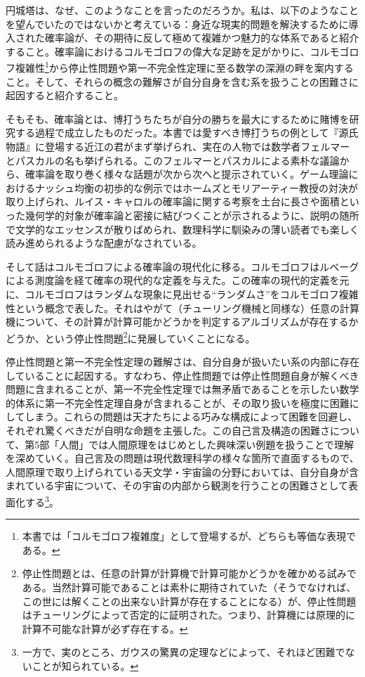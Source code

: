 \documentclass[10pt, a5paper, twoside]{jsarticle}
\theoremstyle{definition}
\begin{document}
		円城塔は、なぜ、このようなことを言ったのだろうか。私は、以下のようなことを望んでいたのではないかと考えている：身近な現実的問題を解決するために導入された確率論が、その期待に反して極めて複雑かつ魅力的な体系であると紹介すること。確率論におけるコルモゴロフの偉大な足跡を足がかりに、コルモゴロフ複雑性\footnote{本書では「コルモゴロフ複雑度」として登場するが、どちらも等価な表現である。}から停止性問題や第一不完全性定理に至る数学の深淵の畔を案内すること。そして、それらの概念の難解さが自分自身を含む系を扱うことの困難さに起因すると紹介すること。

		そもそも、確率論とは、博打うちたちが自分の勝ちを最大にするために賭博を研究する過程で成立したものだった。本書では愛すべき博打うちの例として『源氏物語』に登場する近江の君がまず挙げられ、実在の人物では数学者フェルマーとパスカルの名も挙げられる。このフェルマーとパスカルによる素朴な議論から、確率論を取り巻く様々な話題が次から次へと提示されていく。ゲーム理論におけるナッシュ均衡の初歩的な例示ではホームズとモリアーティー教授の対決が取り上げられ、ルイス・キャロルの確率論に関する考察を土台に長さや面積といった幾何学的対象が確率論と密接に結びつくことが示されるように、説明の随所で文学的なエッセンスが散りばめられ、数理科学に馴染みの薄い読者でも楽しく読み進められるような配慮がなされている。

		そして話はコルモゴロフによる確率論の現代化に移る。コルモゴロフはルベーグによる測度論を経て確率の現代的な定義を与えた。この確率の現代的定義を元に、コルモゴロフはランダムな現象に見出せる“ランダムさ”をコルモゴロフ複雑性という概念で表した。それはやがて（チューリング機械と同様な）任意の計算機について、その計算が計算可能かどうかを判定するアルゴリズムが存在するかどうか、という停止性問題\footnote{停止性問題とは、任意の計算が計算機で計算可能かどうかを確かめる試みである。当然計算可能であることは素朴に期待されていた（そうでなければ、この世には解くことの出来ない計算が存在することになる）が、停止性問題はチューリングによって否定的に証明された。つまり、計算機には原理的に計算不可能な計算が必ず存在する。}に発展していくことになる。

		停止性問題と第一不完全性定理の難解さは、自分自身が扱いたい系の内部に存在していることに起因する。すなわち、停止性問題では停止性問題自身が解くべき問題に含まれることが、第一不完全性定理では無矛盾であることを示したい数学的体系に第一不完全性定理自身が含まれることが、その取り扱いを極度に困難にしてしまう。これらの問題は天才たちによる巧みな構成によって困難を回避し、それぞれ驚くべきだが自明な命題を主張した。この自己言及構造の困難さについて、第5部「人間」では人間原理をはじめとした興味深い例題を扱うことで理解を深めていく。自己言及の問題は現代数理科学の様々な箇所で直面するもので、人間原理で取り上げられている天文学・宇宙論の分野においては、自分自身が含まれている宇宙について、その宇宙の内部から観測を行うことの困難さとして表面化する\footnote{一方で、実のところ、ガウスの驚異の定理などによって、それほど困難でないことが知られている。}。
\end{document}
